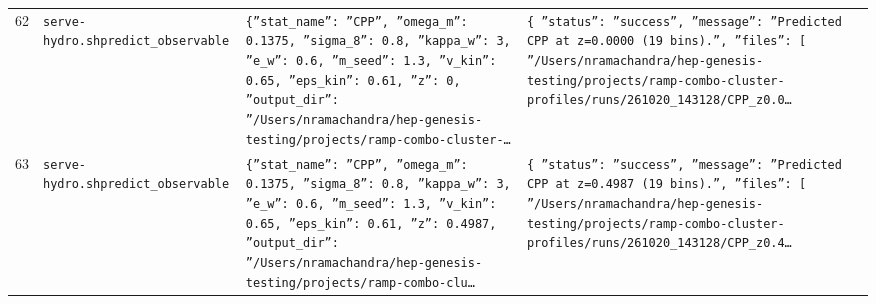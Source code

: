 \documentclass[11pt,a4paper]{article}
\begin{document}
\begin{longtable}{@{}p{}p{}p{}p{}@{}}
62 & \texttt{serve-hydro.sh}\newline\texttt{predict\_\allowbreak{}observable} & \texttt{\{''stat\_\allowbreak{}name'':\allowbreak{} ''CPP'',\allowbreak{} ''omega\_\allowbreak{}m'':\allowbreak{} 0.1375,\allowbreak{} ''sigma\_\allowbreak{}8'':\allowbreak{} 0.8,\allowbreak{} ''kappa\_\allowbreak{}w'':\allowbreak{} 3,\allowbreak{} ''e\_\allowbreak{}w'':\allowbreak{} 0.6,\allowbreak{} ''m\_\allowbreak{}seed'':\allowbreak{} 1.3,\allowbreak{} ''v\_\allowbreak{}kin'':\allowbreak{} 0.65,\allowbreak{} ''eps\_\allowbreak{}kin'':\allowbreak{} 0.61,\allowbreak{} ''z'':\allowbreak{} 0,\allowbreak{} ''output\_\allowbreak{}dir'':\allowbreak{} ''/\allowbreak{}Users/\allowbreak{}nramachandra/\allowbreak{}hep-genesis-testing/\allowbreak{}projects/\allowbreak{}ramp-combo-cluster-\ldots{}\allowbreak{}} & \texttt{\{   ''status'':\allowbreak{} ''success'',\allowbreak{}   ''message'':\allowbreak{} ''Predicted CPP at z=\allowbreak{}0.0000 (19 bins)\allowbreak{}.'',\allowbreak{}   ''files'':\allowbreak{} [     ''/\allowbreak{}Users/\allowbreak{}nramachandra/\allowbreak{}hep-genesis-testing/\allowbreak{}projects/\allowbreak{}ramp-combo-cluster-profiles/\allowbreak{}runs/\allowbreak{}261020\_\allowbreak{}143128/\allowbreak{}CPP\_\allowbreak{}z0.0\ldots{}\allowbreak{}} \\
63 & \texttt{serve-hydro.sh}\newline\texttt{predict\_\allowbreak{}observable} & \texttt{\{''stat\_\allowbreak{}name'':\allowbreak{} ''CPP'',\allowbreak{} ''omega\_\allowbreak{}m'':\allowbreak{} 0.1375,\allowbreak{} ''sigma\_\allowbreak{}8'':\allowbreak{} 0.8,\allowbreak{} ''kappa\_\allowbreak{}w'':\allowbreak{} 3,\allowbreak{} ''e\_\allowbreak{}w'':\allowbreak{} 0.6,\allowbreak{} ''m\_\allowbreak{}seed'':\allowbreak{} 1.3,\allowbreak{} ''v\_\allowbreak{}kin'':\allowbreak{} 0.65,\allowbreak{} ''eps\_\allowbreak{}kin'':\allowbreak{} 0.61,\allowbreak{} ''z'':\allowbreak{} 0.4987,\allowbreak{} ''output\_\allowbreak{}dir'':\allowbreak{} ''/\allowbreak{}Users/\allowbreak{}nramachandra/\allowbreak{}hep-genesis-testing/\allowbreak{}projects/\allowbreak{}ramp-combo-clu\ldots{}\allowbreak{}} & \texttt{\{   ''status'':\allowbreak{} ''success'',\allowbreak{}   ''message'':\allowbreak{} ''Predicted CPP at z=\allowbreak{}0.4987 (19 bins)\allowbreak{}.'',\allowbreak{}   ''files'':\allowbreak{} [     ''/\allowbreak{}Users/\allowbreak{}nramachandra/\allowbreak{}hep-genesis-testing/\allowbreak{}projects/\allowbreak{}ramp-combo-cluster-profiles/\allowbreak{}runs/\allowbreak{}261020\_\allowbreak{}143128/\allowbreak{}CPP\_\allowbreak{}z0.4\ldots{}\allowbreak{}} \\

\end{longtable}
\end{document}
